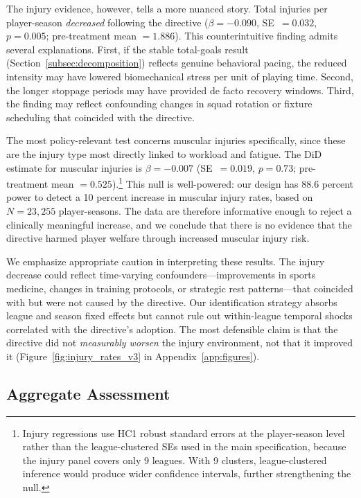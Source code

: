 \documentclass[12pt]{article}
\begin{document}
The injury evidence, however, tells a more nuanced story. Total injuries
per player-season \emph{decreased} following the directive ($\beta =
-0.090$, SE~$= 0.032$, $p = 0.005$; pre-treatment mean $= 1.886$). This
counterintuitive finding admits several explanations. First, if the
stable total-goals result (Section~\ref{subsec:decomposition}) reflects
genuine behavioral pacing, the reduced intensity may have lowered
biomechanical stress per unit of playing time.
Second, the longer stoppage periods may have provided de facto recovery
windows. Third, the finding may
reflect confounding changes in squad rotation or fixture scheduling that
coincided with the directive.

The most policy-relevant test concerns muscular injuries specifically,
since these are the injury type most directly linked to workload and
fatigue. The DiD estimate for muscular injuries is
$\beta = -0.007$ (SE~$= 0.019$, $p = 0.73$; pre-treatment mean $=
0.525$).\footnote{Injury regressions use HC1 robust standard errors at the player-season level rather than the league-clustered SEs used in the main specification, because the injury panel covers only 9 leagues. With 9 clusters, league-clustered inference would produce wider confidence intervals, further strengthening the null.} This null is well-powered: our design has 88.6 percent power to
detect a 10 percent increase in muscular injury rates, based on
$N = 23{,}255$ player-seasons. The data are therefore informative enough
to reject a clinically meaningful increase, and we conclude that there is
no evidence that the directive harmed player welfare through increased
muscular injury risk.

We emphasize appropriate caution in interpreting these results. The injury
decrease could reflect time-varying confounders---improvements in sports
medicine, changes in training protocols, or strategic rest
patterns---that coincided with but were not caused by the directive.
Our identification strategy absorbs league and season fixed effects but
cannot rule out within-league temporal shocks correlated with the
directive's adoption. The most defensible claim is that the directive did
not \emph{measurably worsen} the injury environment, not that it improved
it (Figure~\ref{fig:injury_rates_v3} in Appendix~\ref{app:figures}).

\subsection{Aggregate Assessment}
\end{document}
